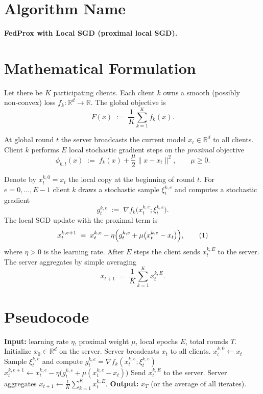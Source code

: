 \documentclass{article}
\newcommand{\R}{\mathbb{R}}
\begin{document}
\section*{Algorithm Name}
\textbf{FedProx with Local SGD (proximal local SGD).}

\section*{Mathematical Formulation}
Let there be $K$ participating clients.  
Each client $k$ owns a smooth (possibly non‑convex) loss $f_k:\R^d\rightarrow\R$.  
The global objective is 
\[
F(x)\;:=\;\frac1K\sum_{k=1}^{K}f_k(x).
\]

At global round $t$ the server broadcasts the current model $x_t\in\R^d$ to all clients.  
Client $k$ performs $E$ local stochastic gradient steps on the \emph{proximal} objective
\[
\phi_{k,t}(x)\;:=\;f_k(x)+\frac{\mu}{2}\|x-x_t\|^2,\qquad \mu\ge 0 .
\]

Denote by $x_{t}^{k,0}=x_t$ the local copy at the beginning of round $t$.
For $e=0,\dots,E-1$ client $k$ draws a stochastic sample $\xi_{t}^{k,e}$ and computes a stochastic gradient
\[
g_{t}^{k,e}\;:=\;\nabla f_k\bigl(x_{t}^{k,e};\xi_{t}^{k,e}\bigr).
\]
The local SGD update with the proximal term is
\[
x_{t}^{k,e+1}
\;=\;
x_{t}^{k,e}
-\eta\Bigl(g_{t}^{k,e}+\mu\bigl(x_{t}^{k,e}-x_t\bigr)\Bigr),
\tag{1}
\]
where $\eta>0$ is the learning rate.  
After $E$ steps the client sends $x_{t}^{k,E}$ to the server.  
The server aggregates by simple averaging
\[
x_{t+1}
\;=\;
\frac1K\sum_{k=1}^{K}x_{t}^{k,E}.
\tag{2}
\]

\section*{Pseudocode}
\begin{algorithm}[H]
\caption{FedProx with Local SGD}
\begin{algorithmic}[1]
\State \textbf{Input:} learning rate $\eta$, proximal weight $\mu$, local epochs $E$, total rounds $T$.
\State Initialize $x_0\in\R^d$ on the server.
    \State Server broadcasts $x_t$ to all clients.
        \State $x_{t}^{k,0}\gets x_t$
            \State Sample $\xi_{t}^{k,e}$ and compute $g_{t}^{k,e}=\nabla f_k(x_{t}^{k,e};\xi_{t}^{k,e})$
            \State $x_{t}^{k,e+1}\gets x_{t}^{k,e}
                -\eta\bigl(g_{t}^{k,e}+\mu(x_{t}^{k,e}-x_t)\bigr)$
        \EndFor
        \State Send $x_{t}^{k,E}$ to the server.
    \EndFor
    \State Server aggregates $x_{t+1}\gets \frac1K\sum_{k=1}^{K}x_{t}^{k,E}$.
\EndFor
\State \textbf{Output:} $x_T$ (or the average of all iterates).
\end{algorithmic}
\end{algorithm}
\end{document}
